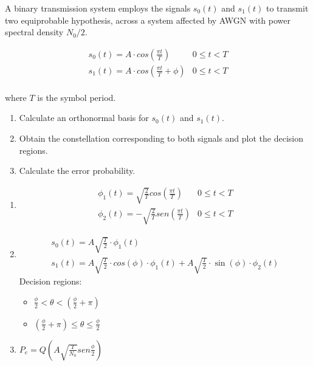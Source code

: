 \documentclass[es,boletin]{uah}
\begin{document}
{

	A binary transmission system employs the signals $s_0(t)$ and $s_1(t)$ to transmit two equiprobable hypothesis, across a system affected by AWGN with power spectral density $N_0/2$.

\begin{displaymath}
	\begin{array}{ll}
		s_0(t) = A \cdot cos\left ( \frac{\pi t}{T} \right ) & 0\leq t<T \\
		s_1(t) = A \cdot cos\left ( \frac{\pi t}{T} + \phi \right ) & 0\leq t<T \\
	\end{array}
\end{displaymath}

where $T$ is the symbol period.

\begin{enumerate}
	\item Calculate an orthonormal basis for $s_0(t)$ and $s_1(t)$.
	\item Obtain the constellation corresponding to both signals and plot the decision regions.
	\item Calculate the error probability.
\end{enumerate}

}
{

\begin{enumerate}
	\item \begin{displaymath}
		\begin{array}{ll}
			\phi_1(t) = \sqrt{\frac{2}{T}} cos \left ( \frac{\pi t}{T} \right ) & 0 \leq t < T \\
			\phi_2(t) = -\sqrt{\frac{2}{T}} sen \left ( \frac{\pi t}{T} \right ) & 0 \leq t < T 
		\end{array}
		\end{displaymath}
	\item \begin{displaymath}
		\begin{array}{l}
			s_0(t) = A \sqrt{\frac{T}{2}} \cdot\phi_1(t) \\
			s_1(t) = A \sqrt{\frac{T}{2}} \cdot cos(\phi) \cdot \phi_1(t) + A \sqrt{\frac{T}{2}} \cdot \sin(\phi) \cdot \phi_2(t)
		\end{array}
		\end{displaymath}
		Decision regions: 
		\begin{itemize}
			\item 	$\frac{\phi}{2} < \theta < (\frac{\phi}{2} + \pi)$
			\item 	$(\frac{\phi}{2} + \pi) \leq \theta \leq \frac{\phi}{2}$  
		\end{itemize}
	\item $P_e = Q\left ( A \sqrt{\frac{T}{N_0}} sen \frac{\phi}{2} \right )$
\end{enumerate}

}
\end{document}
